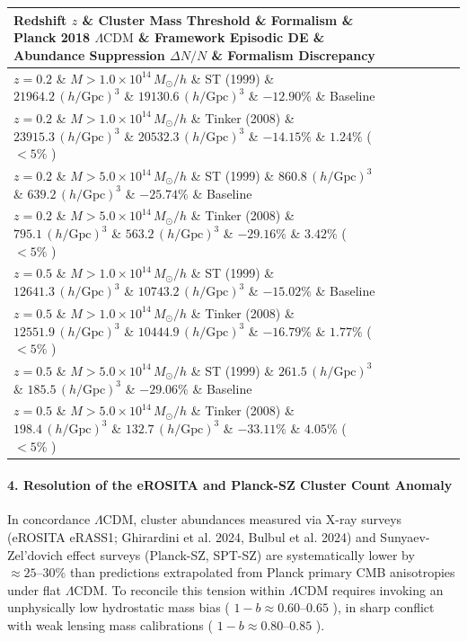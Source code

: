 \documentclass[11pt,a4paper]{article}
\theoremstyle{definition}\newtheorem{definition}{Definition}
\theoremstyle{remark}\newtheorem{remark}{Remark}
\begin{document}
\begin{longtable}{lllllll}
\hline
Redshift $z$ \& Cluster Mass Threshold \& Formalism \& Planck 2018 $\Lambda\text{CDM}$ \& Framework Episodic DE \& Abundance Suppression $\Delta N / N$ \& Formalism Discrepancy \\
\hline
$z = 0.2$ \& $M > 1.0 \times 10^{14} \, M_\odot/h$ \& ST (1999) \& $21964.2 \, (h/\text{Gpc})^3$ \& $19130.6 \, (h/\text{Gpc})^3$ \& \textbf{$-12.90\%$} \& Baseline \\
$z = 0.2$ \& $M > 1.0 \times 10^{14} \, M_\odot/h$ \& Tinker (2008) \& $23915.3 \, (h/\text{Gpc})^3$ \& $20532.3 \, (h/\text{Gpc})^3$ \& \textbf{$-14.15\%$} \& $1.24\%$ ( $< 5\%$ ) \\
$z = 0.2$ \& $M > 5.0 \times 10^{14} \, M_\odot/h$ \& ST (1999) \& $860.8 \, (h/\text{Gpc})^3$ \& $639.2 \, (h/\text{Gpc})^3$ \& \textbf{$-25.74\%$} \& Baseline \\
$z = 0.2$ \& $M > 5.0 \times 10^{14} \, M_\odot/h$ \& Tinker (2008) \& $795.1 \, (h/\text{Gpc})^3$ \& $563.2 \, (h/\text{Gpc})^3$ \& \textbf{$-29.16\%$} \& $3.42\%$ ( $< 5\%$ ) \\
$z = 0.5$ \& $M > 1.0 \times 10^{14} \, M_\odot/h$ \& ST (1999) \& $12641.3 \, (h/\text{Gpc})^3$ \& $10743.2 \, (h/\text{Gpc})^3$ \& \textbf{$-15.02\%$} \& Baseline \\
$z = 0.5$ \& $M > 1.0 \times 10^{14} \, M_\odot/h$ \& Tinker (2008) \& $12551.9 \, (h/\text{Gpc})^3$ \& $10444.9 \, (h/\text{Gpc})^3$ \& \textbf{$-16.79\%$} \& $1.77\%$ ( $< 5\%$ ) \\
$z = 0.5$ \& $M > 5.0 \times 10^{14} \, M_\odot/h$ \& ST (1999) \& $261.5 \, (h/\text{Gpc})^3$ \& $185.5 \, (h/\text{Gpc})^3$ \& \textbf{$-29.06\%$} \& Baseline \\
$z = 0.5$ \& $M > 5.0 \times 10^{14} \, M_\odot/h$ \& Tinker (2008) \& $198.4 \, (h/\text{Gpc})^3$ \& $132.7 \, (h/\text{Gpc})^3$ \& \textbf{$-33.11\%$} \& $4.05\%$ ( $< 5\%$ ) \\
\hline
\end{longtable}\paragraph{4. Resolution of the eROSITA and Planck-SZ Cluster Count Anomaly}

In concordance $\Lambda\text{CDM}$, cluster abundances measured via X-ray surveys (eROSITA eRASS1; Ghirardini et al. 2024, Bulbul et al. 2024) and Sunyaev-Zel'dovich effect surveys (Planck-SZ, SPT-SZ) are systematically lower by $\approx 25\text{--}30\%$ than predictions extrapolated from Planck primary CMB anisotropies under flat $\Lambda\text{CDM}$. To reconcile this tension within $\Lambda\text{CDM}$ requires invoking an unphysically low hydrostatic mass bias ( $1-b \approx 0.60\text{--}0.65$ ), in sharp conflict with weak lensing mass calibrations ( $1-b \approx 0.80\text{--}0.85$ ).
\end{document}
